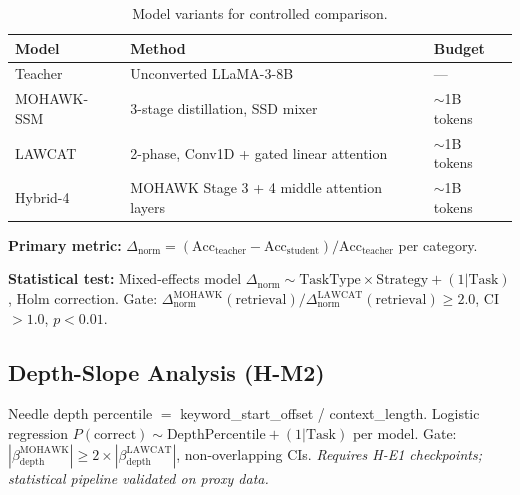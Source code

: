 \begin{table}[h]
\centering
\caption{Model variants for controlled comparison.}
\begin{tabular}{lll}
\toprule
\textbf{Model} & \textbf{Method} & \textbf{Budget} \\
\midrule
Teacher    & Unconverted LLaMA-3-8B                        & ---         \\
MOHAWK-SSM & 3-stage distillation, SSD mixer               & $\sim$1B tokens \\
LAWCAT     & 2-phase, Conv1D + gated linear attention       & $\sim$1B tokens \\
Hybrid-4   & MOHAWK Stage 3 + 4 middle attention layers    & $\sim$1B tokens \\
\bottomrule
\end{tabular}
\end{table}

\textbf{Primary metric:}
$\Delta_\text{norm} = (\text{Acc}_\text{teacher} - \text{Acc}_\text{student}) /
\text{Acc}_\text{teacher}$ per category.

\textbf{Statistical test:} Mixed-effects model
$\Delta_\text{norm} \sim \text{TaskType} \times \text{Strategy} + (1|\text{Task})$,
Holm correction. Gate: $\Delta_\text{norm}^\text{MOHAWK}(\text{retrieval}) /
\Delta_\text{norm}^\text{LAWCAT}(\text{retrieval}) \geq 2.0$, CI $> 1.0$, $p < 0.01$.

\subsection{Depth-Slope Analysis (H-M2)}

Needle depth percentile $=$ keyword\_start\_offset / context\_length. Logistic regression
$P(\text{correct}) \sim \text{DepthPercentile} + (1|\text{Task})$ per model. Gate:
$|\beta_\text{depth}^\text{MOHAWK}| \geq 2 \times |\beta_\text{depth}^\text{LAWCAT}|$,
non-overlapping CIs. \emph{Requires H-E1 checkpoints; statistical pipeline validated on
proxy data.}

